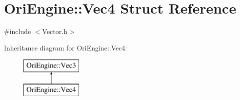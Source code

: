 \hypertarget{struct_ori_engine_1_1_vec4}{}\section{Ori\+Engine\+:\+:Vec4 Struct Reference}
\label{struct_ori_engine_1_1_vec4}


{\ttfamily \#include $<$Vector.\+h$>$}

Inheritance diagram for Ori\+Engine\+:\+:Vec4\+:\begin{figure}[H]
\begin{center}
\leavevmode
\includegraphics[height=2.000000cm]{struct_ori_engine_1_1_vec4}
\end{center}
\end{figure}

